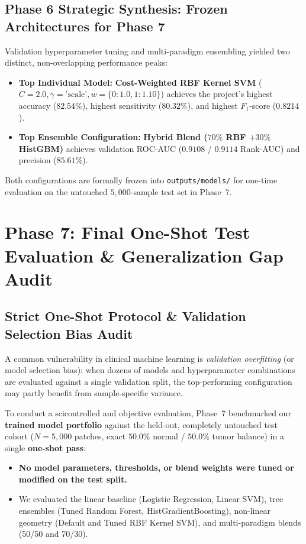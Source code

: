\documentclass[11pt,a4paper]{article}
\begin{document}
\subsection{Phase 6 Strategic Synthesis: Frozen Architectures for Phase 7}
Validation hyperparameter tuning and multi-paradigm ensembling yielded two distinct, non-overlapping performance peaks:
\begin{itemize}[noitemsep]
    \item \textbf{Top Individual Model:} \textbf{Cost-Weighted RBF Kernel SVM} ($C=2.0, \gamma=\text{'scale'}, w=\{0: 1.0, 1: 1.10\}$) achieves the project's highest accuracy ($\mathbf{82.54\%}$), highest sensitivity ($\mathbf{80.32\%}$), and highest $F_1$-score ($\mathbf{0.8214}$).
    \item \textbf{Top Ensemble Configuration:} \textbf{Hybrid Blend ($70\%$ RBF $+ 30\%$ HistGBM)} achieves validation ROC-AUC ($\mathbf{0.9108}$ / $\mathbf{0.9114}$ Rank-AUC) and precision ($\mathbf{85.61\%}$).
\end{itemize}
Both configurations are formally frozen into \texttt{outputs/models/} for one-time evaluation on the untouched $5,000$-sample test set in Phase~7.



\section{Phase 7: Final One-Shot Test Evaluation \& Generalization Gap Audit}

\subsection{Strict One-Shot Protocol \& Validation Selection Bias Audit}
A common vulnerability in clinical machine learning is \textit{validation overfitting} (or model selection bias): when dozens of models and hyperparameter combinations are evaluated against a single validation split, the top-performing configuration may partly benefit from sample-specific variance. 

To conduct a scicontrolled and objective evaluation, Phase~7 benchmarked our \textbf{trained model portfolio} against the held-out, completely untouched test cohort ($N=5,000$ patches, exact $50.0\%$ normal / $50.0\%$ tumor balance) in a single \textbf{one-shot pass}:
\begin{itemize}[noitemsep]
    \item \textbf{No model parameters, thresholds, or blend weights were tuned or modified on the test split.}
    \item We evaluated the linear baseline (Logistic Regression, Linear SVM), tree ensembles (Tuned Random Forest, HistGradientBoosting), non-linear geometry (Default and Tuned RBF Kernel SVM), and multi-paradigm blends (50/50 and 70/30).
\end{itemize}
\end{document}
